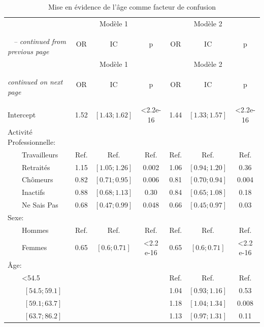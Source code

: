 \documentclass{book}
\begin{document}
\begin{longtable}{lccc|ccc}\caption{Mise en évidence de l'âge comme facteur de confusion}\\
    \hline  
    		 &  &    Modèle 1 &   &    &   Modèle 2    &\\
		& \multirow{3}{*}{OR} & \multirow{3}{*}{IC}& \multirow{3}{*}{p} & \multirow{3}{*}{OR} & \multirow{3}{*}{IC}& \multirow{3}{*}{p}\\ 
		 &      &     &    &   	    &  	    &\\
   \hline
    \hline     
    \endfirsthead 
    \multicolumn{4}{l}{\tablename\ \thetable{} \textit{-- continued from previous page}}\\ 
    \hline
	    		 & &    Modèle 1 &   &   &   Modèle 2    &\\
		& \multirow{3}{*}{OR} & \multirow{3}{*}{IC}& \multirow{3}{*}{p} & \multirow{3}{*}{OR} & \multirow{3}{*}{IC}& \multirow{3}{*}{p}\\ 
		 &      &     &    &   	    &  	    &\\
    \hline
    \hline  
    \endhead   
    \hline
    \multicolumn{4}{l}{\textit{continued on next page}} \\ 
    &    				    &    			    &                  \\ 
    \endfoot   
    \multicolumn{4}{l}{}  \\ 
    \endlastfoot 
        
Intercept & 1.52 & $\left[1.43 ; 1.62 \right]$ & <2.2e-16 & 1.44 & $\left[1.33 ; 1.57 \right]$ & <2.2e-16\\
Activité Professionnelle: &              &              &	&&&\\ 
$\qquad$Travailleurs 		&		Ref.		& 	Ref.		&	Ref.&Ref.&Ref.&Ref.\\ 
$\qquad$Retraités&1.15 &$\left[1.05 ; 1.26 \right]$ & 0.002&1.06 &$\left[0.94 ; 1.20 \right]$ & 0.36\\ 
$\qquad$Chômeurs & 0.82& $\left[0.71 ; 0.95\right]$& 0.006 & 0.81& $\left[0.70 ; 0.94\right]$& 0.004\\ 
$\qquad$Inactifs  & 0.88& $\left[0.68 ; 1.13\right]$& 0.30 & 0.84& $\left[0.65 ; 1.08\right]$& 0.18\\  
$\qquad$Ne Sais Pas & 0.68& $\left[0.47 ; 0.99\right]$ & 0.048& 0.66& $\left[0.45 ; 0.97\right]$ & 0.03 \\
Sexe: &              &              &                        &&&  \\ 
$\qquad$Hommes &Ref. & Ref.& Ref.&Ref.&Ref.&Ref.\\ 
$\qquad$Femmes & 0.65& $\left[0.6 ; 0.71 \right]$ & <2.2 e-16& 0.65& $\left[0.6 ; 0.71 \right]$ & <2.2 e-16\\
Âge: &&&&&&\\
$\qquad$<54.5 &&&&Ref.&Ref.&Ref.\\
$\qquad$ $\left[54.5 ; 59.1 \right]$&&& &1.04& $\left[0.93 ; 1.16 \right]$& 0.53\\
$\qquad$ $\left[59.1 ; 63.7\right]$&&& &1.18&$\left[1.04 ; 1.34 \right]$& 0.008\\
$\qquad$ $\left[63.7 ; 86.2 \right]$&&&&1.13&$\left[0.97 ; 1.31 \right]$&0.11\\  
 

\end{longtable}
\end{document}
